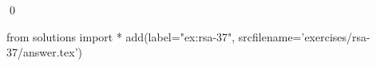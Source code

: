 
\begin{ex} 
  \label{ex:rsa-37}
  
  \qed
\end{ex} 
\begin{python0}
from solutions import *
add(label="ex:rsa-37",
    srcfilename='exercises/rsa-37/answer.tex') 
\end{python0}
